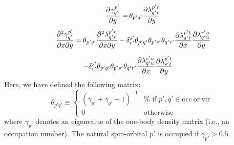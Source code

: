 \begin{subappendices}
\begin{equation}
        \begin{array}{r@{\,}l}
            \dfrac{\partial \gamma^{p'}_{q'}}{\partial{y}}
            =
            &
            \theta_{p'q'}
            \dfrac{\partial \lambda^{p'r}_{q'r}}{\partial{y}}
        \end{array}
    \end{equation}
    \begin{equation}
        \label{eq:one-body-n-rep-hessian}
        \begin{array}{r@{\,}l}
            \dfrac{\partial^2 \gamma^{p'}_{q'}}{%
                \partial{x}
                \partial{y}
            }
            =
            &
            \theta_{p'q'}
            \dfrac{\partial^2 \lambda^{p'r}_{q'r}}{%
                \partial{x}
                \partial{y}
            }
            -
            \delta_{r'}^{s'}
            \theta_{p'q'}
            \theta_{p's'}
            \theta_{q'r'}
            \dfrac{\partial \lambda^{p't}_{s't}}{%
                \partial{x}
            }
            \dfrac{\partial \lambda^{r'u}_{q'u}}{\partial{y}}
            \\[15pt]
            &
            -
            \delta_{r'}^{s'}
            \theta_{p'q'}
            \theta_{p's'}
            \theta_{q'r'}
            \dfrac{\partial \lambda^{r'u}_{q'u}}{\partial{x}}
            \dfrac{\partial \lambda^{p't}_{s't}}{\partial{y}}
        \end{array}
    \end{equation}
    Here, we have defined the following matrix:
    \begin{equation}
        \theta_{p'q'}
        \equiv
        \left\{
            \begin{array}{cc}
                (
                    \gamma_{p'}
                    +
                    \gamma_{q'}
                    -
                    1
                )^{-1}
                &
                \text{%
                    if
                    \(p',q'\in \mathrm{occ \ or \ vir}\)
                }
                \\
                0
                &
                \text{otherwise}
            \end{array}
        \right.
    \end{equation}
    where \(\gamma_{p'}\) denotes an eigenvalue of the one-body density matrix
    (i.e., an occupation number).
    The natural spin-orbital $p'$ is occupied if \(\gamma_{p'} > 0.5\).


\end{subappendices}
